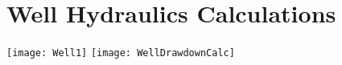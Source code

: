 %
%
%
%
%
%
%
%
%
%
%










\section{Well Hydraulics Calculations} 

\begin{center}
\texttt{[image: Well1]} \hspace{1cm} \texttt{[image: WellDrawdownCalc]}
\end{center}

